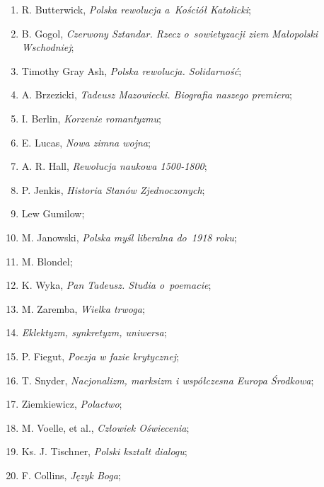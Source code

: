 \documentclass[a4paper,11pt]{article}
\begin{document}
\begin{enumerate}
\item R. Butterwick, \textit{Polska rewolucja a~Kościół Katolicki};

\item B. Gogol, \textit{Czerwony Sztandar. Rzecz o~sowietyzacji ziem
    Małopolski Wschodniej};

\item Timothy Gray Ash, \textit{Polska rewolucja. Solidarność};

\item A. Brzezicki, \textit{Tadeusz Mazowiecki. Biografia naszego
    premiera};

\item I. Berlin, \textit{Korzenie romantyzmu};

\item E. Lucas, \textit{Nowa zimna wojna};

\item A. R. Hall, \textit{Rewolucja naukowa 1500-1800};

\item P. Jenkis, \textit{Historia Stanów Zjednoczonych};

\item Lew Gumilow;

\item M. Janowski, \textit{Polska myśl liberalna do~1918 roku};

\item M. Blondel;

\item K. Wyka, \textit{Pan Tadeusz. Studia o~poemacie};

\item M. Zaremba, \textit{Wielka trwoga};

\item \textit{Eklektyzm, synkretyzm, uniwersa};

\item P. Fiegut, \textit{Poezja w fazie krytycznej};

\item T. Snyder, \textit{Nacjonalizm, marksizm i współczesna Europa
    Środkowa};

\item Ziemkiewicz, \textit{Polactwo};

\item M. Voelle, et al., \textit{Człowiek Oświecenia};

\item Ks. J. Tischner, \textit{Polski kształt dialogu};

\item F. Collins, \textit{Język Boga};


\end{enumerate}
\end{document}
